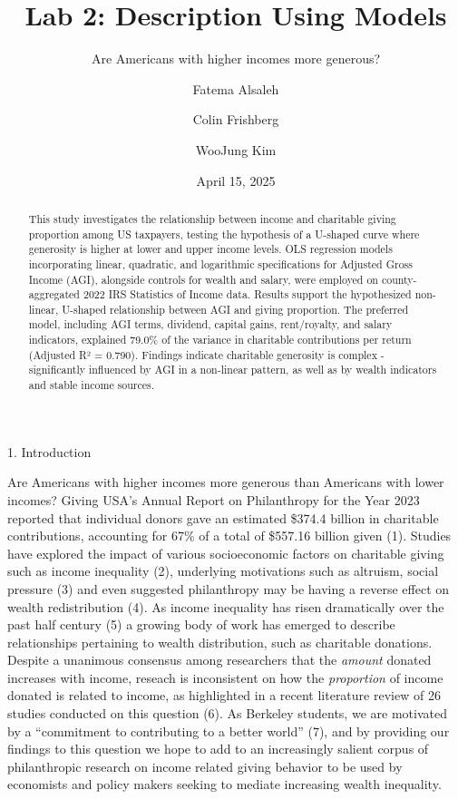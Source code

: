 \documentclass[
  letterpaper,
  DIV=11,
  numbers=noendperiod]{scrartcl}
\title{Lab 2: Description Using Models}
\subtitle{Are Americans with higher incomes more generous?}
\author{Fatema Alsaleh \and Colin Frishberg \and WooJung Kim}
\date{April 15, 2025}
\makeatletter
\let\oldparagraph\paragraph
\renewcommand{\paragraph}{
    \@ifstar
      \xxxParagraphStar
      \xxxParagraphNoStar
  }
\newcommand{\xxxParagraphStar}[1]{\oldparagraph*{#1}\mbox{}}
\newcommand{\xxxParagraphNoStar}[1]{\oldparagraph{#1}\mbox{}}
\makeatother
\begin{document}
\maketitle
\begin{abstract}
This study investigates the relationship between income and charitable
giving proportion among US taxpayers, testing the hypothesis of a
U-shaped curve where generosity is higher at lower and upper income
levels. OLS regression models incorporating linear, quadratic, and
logarithmic specifications for Adjusted Gross Income (AGI), alongside
controls for wealth and salary, were employed on county-aggregated 2022
IRS Statistics of Income data. Results support the hypothesized
non-linear, U-shaped relationship between AGI and giving proportion. The
preferred model, including AGI terms, dividend, capital gains,
rent/royalty, and salary indicators, explained 79.0\% of the variance in
charitable contributions per return (Adjusted R² = 0.790). Findings
indicate charitable generosity is complex - significantly influenced by
AGI in a non-linear pattern, as well as by wealth indicators and stable
income sources.
\end{abstract}


\paragraph{1. Introduction}\label{introduction}

Are Americans with higher incomes more generous than Americans with
lower incomes? Giving USA's Annual Report on Philanthropy for the Year
2023 reported that individual donors gave an estimated \$374.4 billion
in charitable contributions, accounting for 67\% of a total of \$557.16
billion given (1). Studies have explored the impact of various
socioeconomic factors on charitable giving such as income inequality
(2), underlying motivations such as altruism, social pressure (3) and
even suggested philanthropy may be having a reverse effect on wealth
redistribution (4). As income inequality has risen dramatically over the
past half century (5) a growing body of work has emerged to describe
relationships pertaining to wealth distribution, such as charitable
donations. Despite a unanimous consensus among researchers that the
\emph{amount} donated increases with income, reseach is inconsistent on
how the \emph{proportion} of income donated is related to income, as
highlighted in a recent literature review of 26 studies conducted on
this question (6). As Berkeley students, we are motivated by a
``commitment to contributing to a better world'' (7), and by providing
our findings to this question we hope to add to an increasingly salient
corpus of philanthropic research on income related giving behavior to be
used by economists and policy makers seeking to mediate increasing
wealth inequality.
\end{document}
